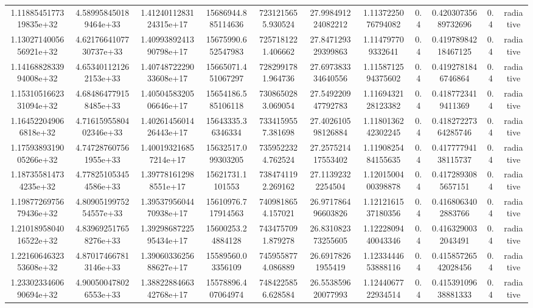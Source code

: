 \begin{table}
\begin{tabular}{ccccccccccc}
1.1188545177319835e+32 & 4.589958450189464e+33 & 1.4124011283124315e+17 & 15686944.885114636 & 7231215655.930524 & 27.998491224082212 & 1.1137225076794082 & 0.4 & 0.42030735689732696 & 0.4 & radiative \\
1.1302714005656921e+32 & 4.6217664107730737e+33 & 1.4099389241390798e+17 & 15675990.652547983 & 7257181221.406662 & 27.847129329399863 & 1.114797709332641 & 0.4 & 0.41978984218467125 & 0.4 & radiative \\
1.1416882833994008e+32 & 4.653401121262153e+33 & 1.4074872229033608e+17 & 15665071.451067297 & 7282991781.964736 & 27.697383334640556 & 1.1158712594375602 & 0.4 & 0.4192781846746864 & 0.4 & radiative \\
1.1531051662331094e+32 & 4.684864779158485e+33 & 1.4050458320506646e+17 & 15654186.585106118 & 7308650283.069054 & 27.549220947792783 & 1.1169432128123382 & 0.4 & 0.4187723419411369 & 0.4 & radiative \\
1.164522049066818e+32 & 4.7161595580402346e+33 & 1.4026145601426443e+17 & 15643335.36346334 & 7334159557.381698 & 27.402610598126884 & 1.1180136242302245 & 0.4 & 0.41827227364285746 & 0.4 & radiative \\
1.1759389319005266e+32 & 4.747287607561955e+33 & 1.400193216857214e+17 & 15632517.099303205 & 7359522324.762524 & 27.257521417553402 & 1.1190825484155635 & 0.4 & 0.41777794138115737 & 0.4 & radiative \\
1.187355814734235e+32 & 4.778251053454586e+33 & 1.397781612988551e+17 & 15621731.1101553 & 7384741192.269162 & 27.11392322254504 & 1.1201500400398878 & 0.4 & 0.4172893085657151 & 0.4 & radiative \\
1.1987726975679436e+32 & 4.8090519975254557e+33 & 1.3953795604470938e+17 & 15610976.717914563 & 7409818654.157021 & 26.971786496603826 & 1.1212161537180356 & 0.4 & 0.4168063402883766 & 0.4 & radiative \\
1.2101895804016522e+32 & 4.839692517658276e+33 & 1.3929868722595434e+17 & 15600253.24884128 & 7434757091.879278 & 26.831082373255605 & 1.1222809440043346 & 0.4 & 0.4163290032043491 & 0.4 & radiative \\
1.2216064632353608e+32 & 4.870174667813146e+33 & 1.3906033625688627e+17 & 15589560.03356109 & 7459558774.086889 & 26.69178261955419 & 1.1233444653888116 & 0.4 & 0.41585726542028456 & 0.4 & radiative \\
1.2330233460690694e+32 & 4.900500478026553e+33 & 1.3882288466342768e+17 & 15578896.407064974 & 7484225856.628584 & 26.553859620077993 & 1.1244067722934514 & 0.4 & 0.41539109638881333 & 0.4 & radiative \\

\end{tabular}
\end{table}
